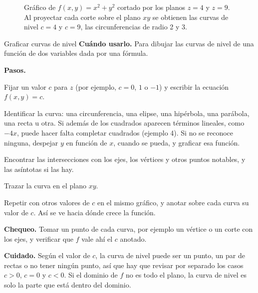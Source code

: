 \documentclass{article}
\newcommand{\rotulo}[2][principal]{\textsf{\bfseries\color{#1}#2}\enspace}
\begin{document}
\begin{figure}[H]
    \caption{Gráfico de \(f(x,y)=x^2+y^2\) cortado por los planos \(z=4\) y \(z=9\). Al proyectar cada corte sobre el plano \(xy\) se obtienen las curvas de nivel \(c=4\) y \(c=9\), las circunferencias de radio 2 y 3.}
\end{figure}

\begin{metodo}[label=met:curvas]{Graficar curvas de nivel}
\rotulo{Cuándo usarlo.} Para dibujar las curvas de nivel de una función de dos variables dada por una fórmula.

\rotulo{Pasos.}
\begin{pasos}
    \item Fijar un valor \(c\) para \(z\) (por ejemplo, \(c=0\), \(1\) o \(-1\)) y escribir la ecuación \(f(x,y)=c\).
    \item Identificar la curva: una circunferencia, una elipse, una hipérbola, una parábola, una recta u otra. Si además de los cuadrados aparecen términos lineales, como \(-4x\), puede hacer falta completar cuadrados (ejemplo 4). Si no se reconoce ninguna, despejar \(y\) en función de \(x\), cuando se pueda, y graficar esa función.
    \item Encontrar las intersecciones con los ejes, los vértices y otros puntos notables, y las asíntotas si las hay.
    \item Trazar la curva en el plano \(xy\).
    \item Repetir con otros valores de \(c\) en el mismo gráfico, y anotar sobre cada curva su valor de \(c\). Así se ve hacia dónde crece la función.
\end{pasos}

\rotulo{Chequeo.} Tomar un punto de cada curva, por ejemplo un vértice o un corte con los ejes, y verificar que \(f\) vale ahí el \(c\) anotado.

\rotulo[oxido]{Cuidado.} Según el valor de \(c\), la curva de nivel puede ser un punto, un par de rectas o no tener ningún punto, así que hay que revisar por separado los casos \(c>0\), \(c=0\) y \(c<0\). Si el dominio de \(f\) no es todo el plano, la curva de nivel es solo la parte que está dentro del dominio.
\end{metodo}
\end{document}
